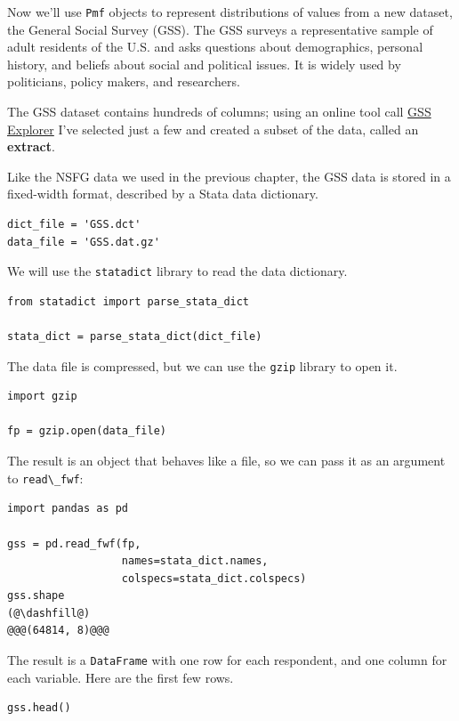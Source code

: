 Now we'll use \passthrough{\lstinline!Pmf!} objects to represent
distributions of values from a new dataset, the General Social Survey
(GSS). The GSS surveys a representative sample of adult residents of the
U.S. and asks questions about demographics, personal history, and
beliefs about social and political issues. It is widely used by
politicians, policy makers, and researchers.

The GSS dataset contains hundreds of columns; using an online tool call
\href{https://gssdataexplorer.norc.org/}{GSS Explorer} I've selected
just a few and created a subset of the data, called an \textbf{extract}.

Like the NSFG data we used in the previous chapter, the GSS data is
stored in a fixed-width format, described by a Stata data dictionary.

\begin{lstlisting}[]
dict_file = 'GSS.dct'
data_file = 'GSS.dat.gz'
\end{lstlisting}

We will use the \passthrough{\lstinline!statadict!} library to read the
data dictionary.

\begin{lstlisting}[]
from statadict import parse_stata_dict

stata_dict = parse_stata_dict(dict_file)
\end{lstlisting}

The data file is compressed, but we can use the
\passthrough{\lstinline!gzip!} library to open it.

\begin{lstlisting}[]
import gzip

fp = gzip.open(data_file)
\end{lstlisting}

The result is an object that behaves like a file, so we can pass it as
an argument to \passthrough{\lstinline!read\_fwf!}:

\begin{lstlisting}[]
import pandas as pd

gss = pd.read_fwf(fp, 
                  names=stata_dict.names, 
                  colspecs=stata_dict.colspecs)
gss.shape
(@\dashfill@)
@@@(64814, 8)@@@
\end{lstlisting}

The result is a \passthrough{\lstinline!DataFrame!} with one row for
each respondent, and one column for each variable. Here are the first
few rows.

\begin{lstlisting}[]
gss.head()
\end{lstlisting}

